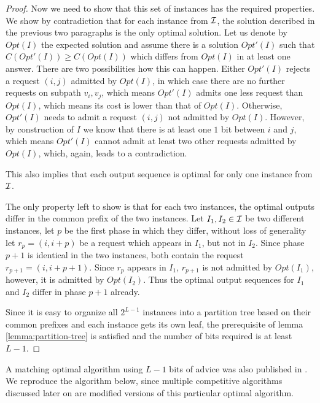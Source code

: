 \begin{proof}
    Now we need to show that this set of instances has the required
    properties. We show by contradiction that for each instance from $\mathcal{I}$,
    the solution described in the previous two paragraphs is the only
    optimal solution. Let us denote by $Opt(I)$ the expected solution and
    assume there is a solution $Opt'(I)$ such that $C(Opt'(I)) \geq
    C(Opt(I))$ which differs from $Opt(I)$ in at least one answer. There
    are two possibilities how this can happen. Either $Opt'(I)$ rejects a
    request $(i, j)$ admitted by $Opt(I)$, in which case there are no
    further requests on subpath $v_i, v_j$, which means $Opt'(I)$ admits
    one less request than $Opt(I)$, which means its cost is lower than
    that of $Opt(I)$. Otherwise, $Opt'(I)$ needs to admit a request $(i,
    j)$ not admitted by $Opt(I)$. However, by construction of $I$ we know
    that there is at least one $1$ bit between $i$ and $j$, which means
    $Opt'(I)$ cannot admit at least two other requests admitted by
    $Opt(I)$, which, again, leads to a contradiction.

    This also implies that each output sequence is optimal for only one
    instance from $\mathcal{I}$.

    The only property left to show is that for each two instances, the
    optimal outputs differ in the common prefix of the two instances. Let
    $I_1, I_2 \in \mathcal{I}$ be two different instances, let $p$ be the first
    phase in which they differ, without loss of generality let $r_p = (i,
    i+p)$ be a request which appears in $I_1$, but not in $I_2$. Since
    phase $p+1$ is identical in the two instances, both contain the
    request $r_{p+1} = (i, i+p+1)$. Since $r_p$ appears in $I_1$,
    $r_{p+1}$ is not admitted by $Opt(I_1)$, however, it is admitted by
    $Opt(I_2)$. Thus the optimal output sequences for $I_1$ and $I_2$
    differ in phase $p+1$ already.

    Since it is easy to organize all $2^{L-1}$ instances into a partition
    tree based on their common prefixes and each instance gets its own
    leaf, the prerequisite of lemma \ref{lemma:partition-tree} is
    satisfied and the number of bits required is at least $L-1$.
\end{proof}

A matching optimal algorithm using $L-1$ bits of advice was also published
in \cite{sofsem2014}. We reproduce the algorithm below, since multiple
competitive algorithms discussed later on are modified versions of this
particular optimal algorithm.

